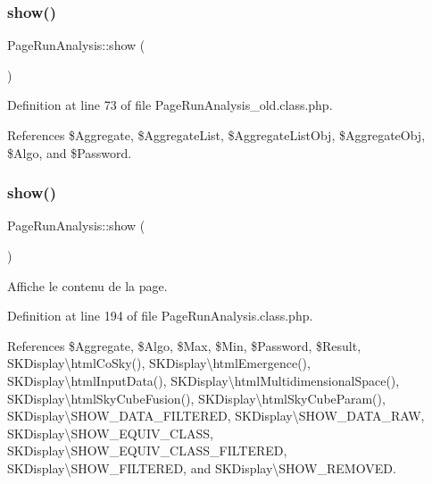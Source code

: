 \subsubsection{\texorpdfstring{show()}{show()}\hspace{0.1cm}{\footnotesize\ttfamily [1/2]}}
{\footnotesize\ttfamily Page\+Run\+Analysis\+::show (\begin{DoxyParamCaption}{ }\end{DoxyParamCaption})\hspace{0.3cm}{\ttfamily [protected]}}



Definition at line 73 of file Page\+Run\+Analysis\+\_\+old.\+class.\+php.



References \$\+Aggregate, \$\+Aggregate\+List, \$\+Aggregate\+List\+Obj, \$\+Aggregate\+Obj, \$\+Algo, and \$\+Password.

\mbox{\label{class_page_run_analysis_acd5e0e94b4fc228110dc253569437ae2}} 
\subsubsection{\texorpdfstring{show()}{show()}\hspace{0.1cm}{\footnotesize\ttfamily [2/2]}}
{\footnotesize\ttfamily Page\+Run\+Analysis\+::show (\begin{DoxyParamCaption}{ }\end{DoxyParamCaption})\hspace{0.3cm}{\ttfamily [protected]}}

Affiche le contenu de la page. 

Definition at line 194 of file Page\+Run\+Analysis.\+class.\+php.



References \$\+Aggregate, \$\+Algo, \$\+Max, \$\+Min, \$\+Password, \$\+Result, S\+K\+Display\textbackslash{}html\+Co\+Sky(), S\+K\+Display\textbackslash{}html\+Emergence(), S\+K\+Display\textbackslash{}html\+Input\+Data(), S\+K\+Display\textbackslash{}html\+Multidimensional\+Space(), S\+K\+Display\textbackslash{}html\+Sky\+Cube\+Fusion(), S\+K\+Display\textbackslash{}html\+Sky\+Cube\+Param(), S\+K\+Display\textbackslash{}\+S\+H\+O\+W\+\_\+\+D\+A\+T\+A\+\_\+\+F\+I\+L\+T\+E\+R\+ED, S\+K\+Display\textbackslash{}\+S\+H\+O\+W\+\_\+\+D\+A\+T\+A\+\_\+\+R\+AW, S\+K\+Display\textbackslash{}\+S\+H\+O\+W\+\_\+\+E\+Q\+U\+I\+V\+\_\+\+C\+L\+A\+SS, S\+K\+Display\textbackslash{}\+S\+H\+O\+W\+\_\+\+E\+Q\+U\+I\+V\+\_\+\+C\+L\+A\+S\+S\+\_\+\+F\+I\+L\+T\+E\+R\+ED, S\+K\+Display\textbackslash{}\+S\+H\+O\+W\+\_\+\+F\+I\+L\+T\+E\+R\+ED, and S\+K\+Display\textbackslash{}\+S\+H\+O\+W\+\_\+\+R\+E\+M\+O\+V\+ED.



